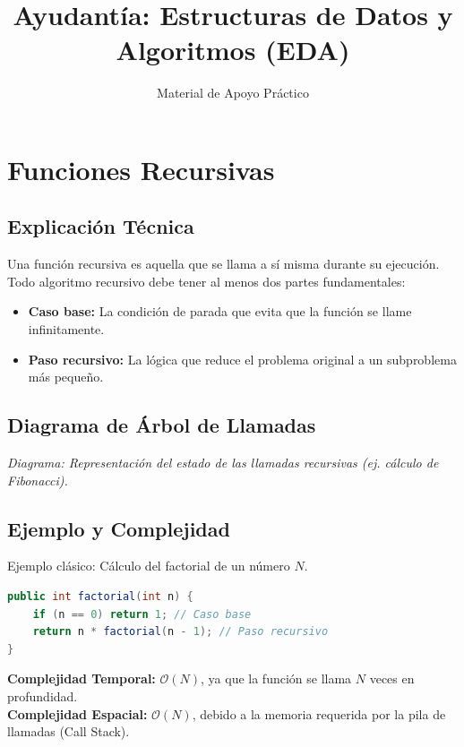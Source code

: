 \documentclass[12pt]{article}
\title{Ayudantía: Estructuras de Datos y Algoritmos (EDA)}
\author{Material de Apoyo Práctico}
\date{}
\begin{document}
\maketitle

\tableofcontents
\newpage

\section{Funciones Recursivas}
\subsection{Explicación Técnica}
Una función recursiva es aquella que se llama a sí misma durante su ejecución. Todo algoritmo recursivo debe tener al menos dos partes fundamentales:
\begin{itemize}
    \item \textbf{Caso base:} La condición de parada que evita que la función se llame infinitamente.
    \item \textbf{Paso recursivo:} La lógica que reduce el problema original a un subproblema más pequeño.
\end{itemize}

\subsection{Diagrama de Árbol de Llamadas}
\begin{center}
\end{center}
\textit{Diagrama: Representación del estado de las llamadas recursivas (ej. cálculo de Fibonacci).}

\subsection{Ejemplo y Complejidad}
Ejemplo clásico: Cálculo del factorial de un número $N$.
\begin{lstlisting}[language=Java]
public int factorial(int n) {
    if (n == 0) return 1; // Caso base
    return n * factorial(n - 1); // Paso recursivo
}
\end{lstlisting}
\textbf{Complejidad Temporal:} $\mathcal{O}(N)$, ya que la función se llama $N$ veces en profundidad. \\
\textbf{Complejidad Espacial:} $\mathcal{O}(N)$, debido a la memoria requerida por la pila de llamadas (Call Stack).
\end{document}
